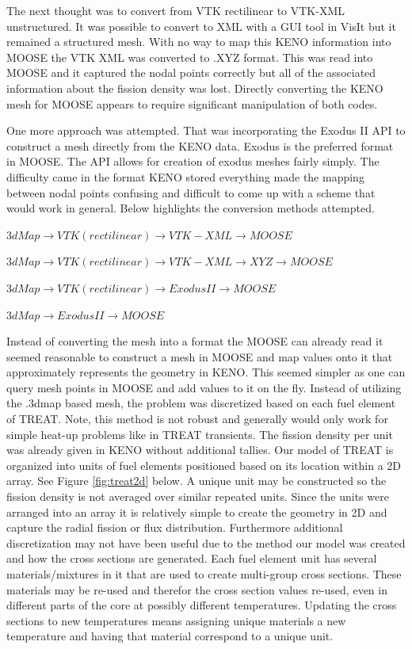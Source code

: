 \documentclass[11pt]{article}
\begin{document}
The next thought was to convert from VTK rectilinear to VTK-XML unstructured.  It was possible to convert to XML with a GUI tool in VisIt but it remained a structured mesh.  With no way to map this KENO information into MOOSE the VTK XML was converted to .XYZ format.  This was read into MOOSE and it captured the nodal points correctly but all of the associated information about the fission density was lost. Directly converting the KENO mesh for MOOSE appears to require significant manipulation of both codes.

One more approach was attempted. That was incorporating the Exodus II API to construct a mesh directly from the KENO data.  Exodus is the preferred format in MOOSE.  The API allows for creation of exodus meshes fairly simply.  The difficulty came in the format KENO stored everything made the mapping between nodal points confusing and difficult to come up with a scheme that would work in general.  
Below highlights the conversion methods attempted.

$3dMap \rightarrow VTK (rectilinear) \rightarrow VTK-XML \rightarrow MOOSE$

$3dMap \rightarrow VTK (rectilinear) \rightarrow VTK-XML \rightarrow XYZ \rightarrow MOOSE$

$3dMap \rightarrow VTK (rectilinear) \rightarrow Exodus II\rightarrow MOOSE$

$3dMap \rightarrow Exodus II \rightarrow MOOSE$

Instead of converting the mesh into a format the MOOSE can already read it seemed reasonable to construct a mesh in MOOSE and map values onto it that approximately represents the geometry in KENO.  This seemed simpler as one can query mesh points in MOOSE and add values to it on the fly.  Instead of utilizing the .3dmap based mesh, the problem was discretized based on each fuel element of TREAT.  Note, this method is not robust and generally would only work for simple heat-up problems like in TREAT transients.  The fission density per unit was already given in KENO without additional tallies.  Our model of TREAT is organized into units of fuel elements positioned based on its location within a 2D array. See Figure \ref{fig:treat2d} below.  A unique unit may be constructed so the fission density is not averaged over similar repeated units.  Since the units were arranged into an array it is relatively simple to create the geometry in 2D and capture the radial fission or flux distribution.  Furthermore additional discretization may not have been useful due to the method our model was created and how the cross sections are generated.  Each fuel element unit has several materials/mixtures in it that are used to create multi-group cross sections. These materials may be re-used and therefor the cross section values re-used, even in different parts of the core at possibly different temperatures.  Updating the cross sections to new temperatures means assigning unique materials a new temperature and having that material correspond to a unique unit.  
\end{document}
